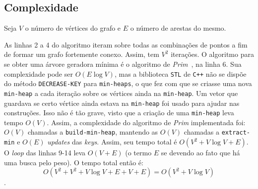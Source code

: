 \documentclass[7pt]{article}
\newcommand{\tit}[1]{\textit{#1}}
\newcommand{\ttt}[1]{\texttt{#1}}
\begin{document}
\begin{multicols}{2}
\section{Complexidade}
Seja $V$ o número de vértices do grafo e $E$ o número de arestas do mesmo.

As linhas 2 a 4 do algoritmo iteram sobre todas as combinações de pontos
a fim de formar um grafo fortemente conexo. Assim, tem $V^2$ iterações.
O algoritmo para se obter uma árvore geradora mínima é o algoritmo de
\tit{Prim}~\cite{clrs}, na linha 6.
Sua complexidade pode ser $O(E\log{V})$, mas a biblioteca \ttt{STL} de
\ttt{C++} não se dispõe do método \ttt{DECREASE-KEY} para \ttt{min-heaps},
o que fez com que se criasse uma nova \ttt{min-heap} a cada iteração
sobre os vértices ainda na \ttt{min-heap}. Um vetor que guardava se
certo vértice ainda estava na \ttt{min-heap} foi usado para ajudar 
nas construções.
Isso não é tão grave, visto que a criação de uma \ttt{min-heap} leva tempo
$O(V)$. Assim, a complexidade do algoritmo de \tit{Prim} implementada foi:
$O(V)$ chamadas a \ttt{build-min-heap}, mantendo as $O(V)$ chamadas a
\ttt{extract-min} e $O(E)$ \tit{updates} das \tit{keys}.
Assim, seu tempo total é $O(V^2 + V\log{V} + E)$.
O \tit{loop} das linhas 9-14 leva $O(V + E)$ (o termo $E$ se devendo ao
fato que há uma busca pelo peso). O tempo total então é:
$$O(V^2 + V^2 + V\log{V} + E + V + E) = O(V^2 + V\log{V})$$.

\printbibliography

\end{multicols}
\end{document}
